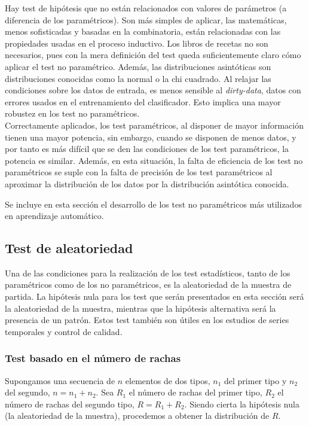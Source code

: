 	Hay test de hipótesis que no están relacionados con 
valores de parámetros (a diferencia de los paramétricos). Son 
más simples de aplicar, las matemáticas, menos sofisticadas y 
basadas en la combinatoria, están relacionadas con las 
propiedades usadas en el proceso inductivo. Los libros de 
recetas no son necesarios, pues con la mera definición del 
test queda suficientemente claro cómo aplicar el test no 
paramétrico. Además, las distribuciones asintóticas son 
distribuciones conocidas como la normal o la chi cuadrado. Al 
relajar las condiciones sobre los datos de entrada, es menos 
sensible al \textit{dirty-data}, datos con errores usados en 
el entrenamiento del clasificador. Esto implica una mayor 
robustez en los test no paramétricos.\\
 	
	Correctamente aplicados, los test paramétricos, al 
disponer de mayor información tienen una mayor potencia, sin 
embargo, cuando se disponen de menos datos, y por tanto es 
más difícil que se den las condiciones de los test 
paramétricos, la potencia es similar. Además, en esta 
situación, la falta de eficiencia de los test no paramétricos 
se suple con la falta de precisión de los test paramétricos 
al aproximar la distribución de los datos por la distribución 
asintótica conocida.


 	Se incluye en esta sección el desarrollo de los test no
paramétricos más utilizados en aprendizaje automático.
 	
 	
\subsection{Test de aleatoriedad}

	Una de las condiciones para la realización de los test 
estadísticos, tanto de los paramétricos como de los no 
paramétricos, es la aleatoriedad de la muestra de partida. La 
hipótesis nula para los test que serán presentados en esta 
sección será la aleatoriedad de la muestra, mientras que la 
hipótesis alternativa será la presencia de un patrón. Estos 
test también son útiles en los estudios de series temporales 
y control de calidad.
	
\subsubsection{Test basado en el número de rachas}

	Supongamos una secuencia de $n$ elementos de dos tipos, 
$n_1$ del primer tipo y $n_2$ del segundo, $n = n_1 + n_2$. 
Sea $R_1$ el número de rachas del primer tipo, $R_2$ el 
número de rachas del segundo tipo, $R = R_1 + R_2$. Siendo 
cierta la hipótesis nula (la aleatoriedad de la muestra), 
procedemos a obtener la distribución de $R$.
	
